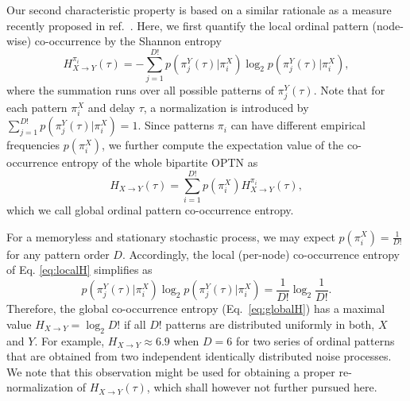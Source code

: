 \documentclass[12pt,aip,cha,reprint,nofootinbib]{revtex4-1}
\begin{document}
Our second characteristic property is based on a similar rationale as a measure recently proposed in ref.~\cite{McCullough2017b}. Here, we first quantify the local ordinal pattern (node-wise) co-occurrence by the Shannon entropy
\begin{equation} \label{eq:localH}
H_{X \to Y}^{\pi_i}(\tau) = - \sum_{j=1}^{D!} p(\pi_{j}^{Y}(\tau) | \pi_i^{X}) \log_2 p(\pi_{j}^{Y}(\tau) | \pi_i^{X}), 
\end{equation}
where the summation runs over all possible patterns of $\pi_j^{Y}(\tau)$. Note that for each pattern $\pi_i^{X}$ and delay $\tau$, a normalization is introduced by $\sum_{j=1}^{D!} p(\pi_{j}^{Y}(\tau) | \pi_i^{X}) = 1$. Since patterns $\pi_i$ can have different empirical frequencies $p(\pi_i^{X})$, we further compute the expectation value of the co-occurrence entropy of the whole bipartite OPTN as 
\begin{equation}  \label{eq:globalH}
H_{X \to Y}(\tau) = \sum_{i=1}^{D!} p(\pi_i^{X}) H_{X \to Y}^{\pi_i}(\tau), 
\end{equation}
which we call global ordinal pattern co-occurrence entropy. 

For a memoryless and stationary stochastic process, we may expect $p(\pi_i^{X} )= \frac{1}{D!}$ for any pattern order $D$. Accordingly, the local (per-node) co-occurrence entropy of Eq. \eqref{eq:localH} simplifies as 
\begin{equation}
p(\pi_{j}^{Y}(\tau) | \pi_i^{X}) \log_2 p(\pi_{j}^{Y}(\tau) | \pi_i^{X}) = \frac{1}{D!} \log_2 \frac{1}{D!}. 
\end{equation}
Therefore, the global co-occurrence entropy (Eq.~\eqref{eq:globalH}) has a maximal value $H_{X \to Y} = \log_2 D!$ if all $D!$ patterns are distributed uniformly in both, $X$ and $Y$. For example, $H_{X \to Y} \approx 6.9$ when $D = 6$ for two series of ordinal patterns that are obtained from two independent identically distributed noise processes. We note that this observation might be used for obtaining a proper re-normalization of $H_{X \to Y}(\tau)$, which shall however not further pursued here.
\end{document}
